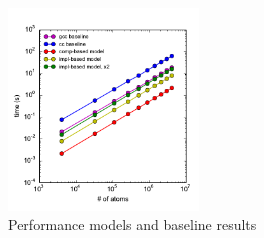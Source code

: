 \documentclass[12pt]{article}
\begin{document}
\begin{figure}[h!]
  \centering
  \includegraphics[width=0.45\textwidth]{../figs/compiler_forceLJ.pdf}
  \caption{Performance models and baseline results}
  \label{fig:perf-models}
\end{figure}
\end{document}
